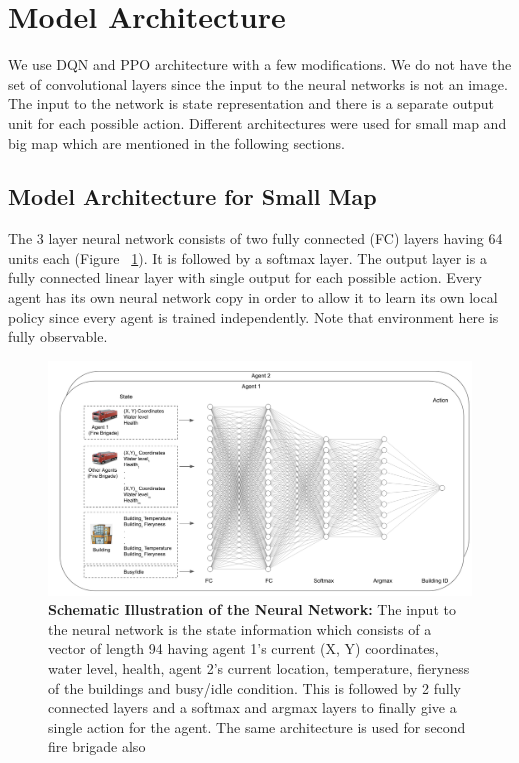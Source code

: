 \documentclass[12pt]{report}
\begin{document}
\section{Model Architecture}

We use DQN and PPO architecture with a few modifications. We do not have the set of convolutional layers since the input to the neural networks is not an image. The input to the network is state representation and there is a separate output unit for each possible action. Different architectures were used for small map and big map which are mentioned in the following sections. 

\subsection{Model Architecture for Small Map} The 3 layer neural network consists of two fully connected (FC) layers having 64 units each (Figure ~\ref{fig:27}). It is followed by a softmax layer. The output layer is a fully connected linear layer with single output for each possible action. Every agent has its own neural network copy in order to allow it to learn its own local policy since every agent is trained independently. Note that environment here is fully observable. 

\begin{figure}[!h]
    \centering
    \includegraphics[width=14cm]{27}
    \caption{\textbf{Schematic Illustration of the Neural Network:} The input to the neural network is the state information which consists of a vector of length 94 having agent 1's current (X, Y) coordinates, water level, health, agent 2's current location, temperature, fieryness of the buildings and busy/idle condition. This is followed by 2 fully connected layers and a softmax and argmax layers to finally give a single action for the agent. The same architecture is used for second fire brigade also}
    \label{fig:27}
\end{figure}
\end{document}
